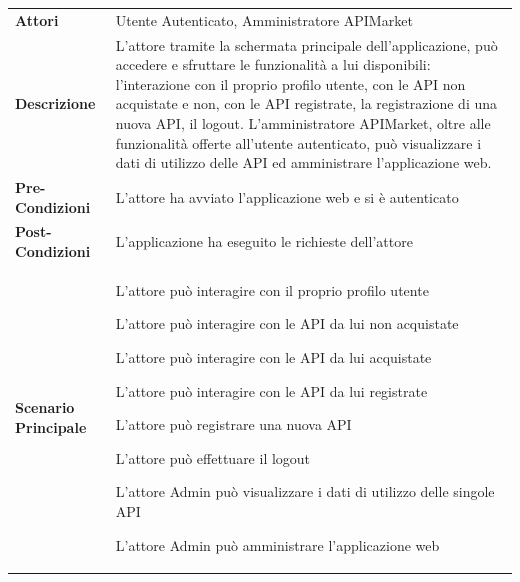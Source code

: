 \begin{longtable}{ l | p{11cm}}
	\hline
	\rowcolor{Gray}
	 \multicolumn{2}{c}{UC2 - Main2} \\
	 \hline
	\textbf{Attori} & Utente Autenticato, Amministratore APIMarket \\
	\textbf{Descrizione} & L'attore tramite la schermata principale
	dell'applicazione, può accedere e sfruttare le funzionalità a lui disponibili: l'interazione
	con il proprio profilo utente, con le API non acquistate e non, con le API registrate, la
	registrazione di una nuova API, il logout. 
	L'amministratore APIMarket, oltre alle funzionalità offerte all'utente autenticato, può
	visualizzare i dati di utilizzo delle API ed amministrare l'applicazione web.  \\
	\textbf{Pre-Condizioni} & L'attore ha avviato l'applicazione web e si è autenticato \\
	\textbf{Post-Condizioni} & L'applicazione ha eseguito le richieste dell'attore \\
	\textbf{Scenario Principale} & 
	\begin{enumerate*}[label=(\arabic*.),itemjoin={\newline}]
		\item L'attore può interagire con il proprio profilo utente
		\item L'attore può interagire con le API da lui non acquistate
		\item L'attore può interagire con le API da lui acquistate
		\item L'attore può interagire con le API da lui registrate
		\item L'attore può registrare una nuova API
		\item L'attore può effettuare il logout
		\item L'attore Admin può visualizzare i dati di utilizzo delle singole API 
		\item L'attore Admin può amministrare l'applicazione web
	\end{enumerate*}\\
\end{longtable}
